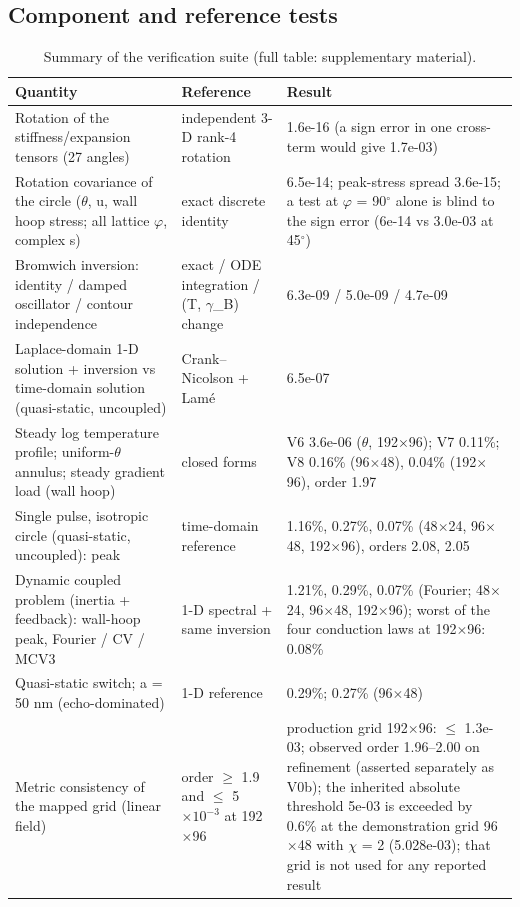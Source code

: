 \documentclass[preprint,12pt]{elsarticle}
\begin{document}
\subsection{Component and reference tests}
\label{sec:5.1}

\begin{table}[htbp]
\centering
\caption{Summary of the verification suite (full table: supplementary material).}
\label{tab:5}
\begin{tabularx}{\textwidth}{XXX}
\toprule
Quantity & Reference & Result \\
\midrule
Rotation of the stiffness/expansion tensors (27 angles) & independent 3-D rank-4 rotation & 1.6e-16 (a sign error in one cross-term would give 1.7e-03) \\
Rotation covariance of the circle ($\theta$, u, wall hoop stress; all lattice $\varphi$, complex s) & exact discrete identity & 6.5e-14; peak-stress spread 3.6e-15; a test at $\varphi$ = 90$^{\circ}$ alone is blind to the sign error (6e-14 vs 3.0e-03 at 45$^{\circ}$) \\
Bromwich inversion: identity / damped oscillator / contour independence & exact / ODE integration / (T, $\gamma$\_B) change & 6.3e-09 / 5.0e-09 / 4.7e-09 \\
Laplace-domain 1-D solution + inversion vs time-domain solution (quasi-static, uncoupled) & Crank--Nicolson + Lam\'e & 6.5e-07 \\
Steady log temperature profile; uniform-$\theta$ annulus; steady gradient load (wall hoop) & closed forms & V6 3.6e-06 ($\theta$, 192$\times$96); V7 0.11\%; V8 0.16\% (96$\times$48), 0.04\% (192$\times$96), order 1.97 \\
Single pulse, isotropic circle (quasi-static, uncoupled): peak & time-domain reference & 1.16\%, 0.27\%, 0.07\% (48$\times$24, 96$\times$48, 192$\times$96), orders 2.08, 2.05 \\
Dynamic coupled problem (inertia + feedback): wall-hoop peak, Fourier / CV / MCV3 & 1-D spectral + same inversion & 1.21\%, 0.29\%, 0.07\% (Fourier; 48$\times$24, 96$\times$48, 192$\times$96); worst of the four conduction laws at 192$\times$96: 0.08\% \\
Quasi-static switch; a = 50 nm (echo-dominated) & 1-D reference & 0.29\%; 0.27\% (96$\times$48) \\
Metric consistency of the mapped grid (linear field) & order $\geq$ 1.9 and $\leq$ 5$\times 10^{-3}$ at 192$\times$96 & production grid 192$\times$96: $\leq$ 1.3e-03; observed order 1.96--2.00 on refinement (asserted separately as V0b); the inherited absolute threshold 5e-03 is exceeded by 0.6\% at the demonstration grid 96$\times$48 with $\chi$ = 2 (5.028e-03); that grid is not used for any reported result \\
\bottomrule
\end{tabularx}
\end{table}
\end{document}
